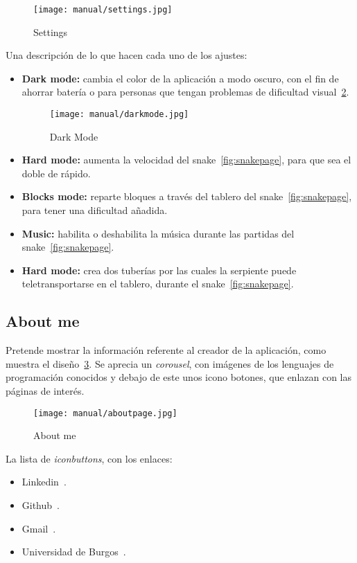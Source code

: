 \begin{figure}[H]
	\centering
	\texttt{[image: manual/settings.jpg]}
	\caption{Settings}\label{fig:settingspage}
\end{figure}

Una descripción de lo que hacen cada uno de los ajustes:

\begin{itemize}
	\item \textbf{Dark mode:} cambia el color de la aplicación a modo oscuro, con el fin de ahorrar batería o para personas que tengan problemas de dificultad visual~\ref{fig:darkmode}.
	\begin{figure}[H]
		\centering
		\texttt{[image: manual/darkmode.jpg]}
		\caption{Dark Mode}\label{fig:darkmode}
	\end{figure}
	\item \textbf{Hard mode:} aumenta la velocidad del snake~\ref{fig:snakepage}, para que sea el doble de rápido.
	\item \textbf{Blocks mode:} reparte bloques a través del tablero del snake~\ref{fig:snakepage}, para tener una dificultad añadida.
	\item \textbf{Music:} habilita o deshabilita la música durante las partidas del snake~\ref{fig:snakepage}.
	\item \textbf{Hard mode:} crea dos tuberías por las cuales la serpiente puede teletransportarse en el tablero, durante el  snake~\ref{fig:snakepage}.
\end{itemize}

\subsection{About me}\label{about}
Pretende mostrar la información referente al creador de la aplicación, como muestra el diseño~\ref{fig:aboutpage}. Se aprecia un \emph{corousel}, con imágenes de los lenguajes de programación conocidos y debajo de este unos icono botones, que enlazan con las páginas de interés.

\begin{figure}[H]
	\centering
	\texttt{[image: manual/aboutpage.jpg]}
	\caption{About me}\label{fig:aboutpage}
\end{figure}

La lista de \emph{iconbuttons}, con los enlaces:
\begin{itemize}
	\item Linkedin~\cite{linkedin:cuenta}.
	\item Github~\cite{github:repo}.
	\item Gmail~\cite{mailto:mailto}.
	\item Universidad de Burgos~\cite{ubu:page}.
\end{itemize}

